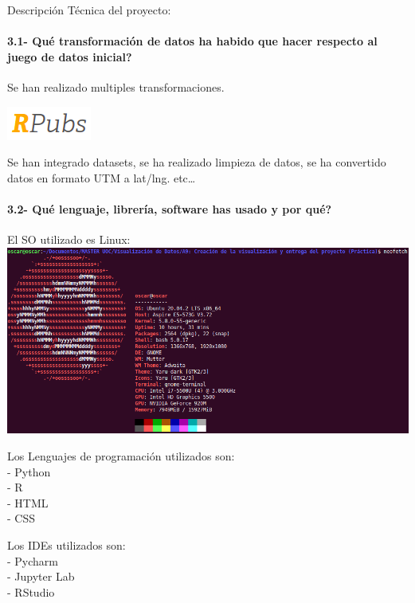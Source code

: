 \documentclass[
]{article}
\begin{document}
Descripción Técnica del proyecto:

\hypertarget{quuxe9-transformaciuxf3n-de-datos-ha-habido-que-hacer-respecto-al-juego-de-datos-inicial}{%
\paragraph{3.1- Qué transformación de datos ha habido que hacer respecto
al juego de datos
inicial?}\label{quuxe9-transformaciuxf3n-de-datos-ha-habido-que-hacer-respecto-al-juego-de-datos-inicial}}

Se han realizado multiples transformaciones.

\href{https://rpubs.com/zumaia/vespa}{\includegraphics{img/rpubs.png}}

Se han integrado datasets, se ha realizado limpieza de datos, se ha
convertido datos en formato UTM a lat/lng. etc\ldots{}

\hypertarget{quuxe9-lenguaje-libreruxeda-software-has-usado-y-por-quuxe9}{%
\paragraph{3.2- Qué lenguaje, librería, software has usado y por
qué?}\label{quuxe9-lenguaje-libreruxeda-software-has-usado-y-por-quuxe9}}

El SO utilizado es Linux:\\
\includegraphics{img/linux.png}

Los Lenguajes de programación utilizados son:\\
- Python\\
- R\\
- HTML\\
- CSS

Los IDEs utilizados son:\\
- Pycharm\\
- Jupyter Lab\\
- RStudio
\end{document}
